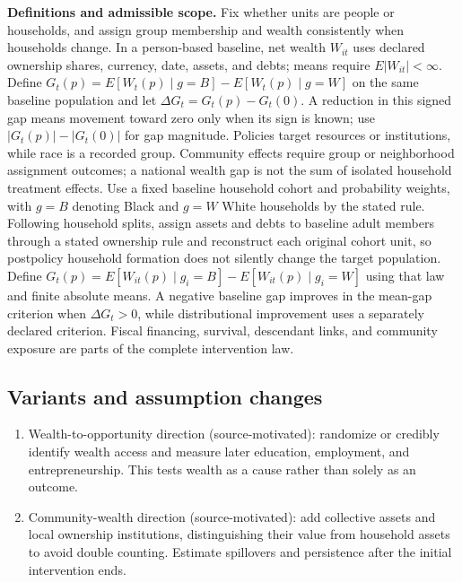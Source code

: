 \documentclass[11pt,a4paper]{article}
\begin{document}
\textbf{Definitions and admissible scope.} Fix whether units are people or households, and assign group membership and wealth consistently when households change. In a person-based baseline, net wealth \(W_{it}\) uses declared ownership shares, currency, date, assets, and debts; means require \(E|W_{it}|<\infty\). Define \(G_t(p)=E[W_t(p)\mid g=B]-E[W_t(p)\mid g=W]\) on the same baseline population and let \(\Delta G_t=G_t(p)-G_t(0)\). A reduction in this signed gap means movement toward zero only when its sign is known; use \(|G_t(p)|-|G_t(0)|\) for gap magnitude. Policies target resources or institutions, while race is a recorded group. Community effects require group or neighborhood assignment outcomes; a national wealth gap is not the sum of isolated household treatment effects. Use a fixed baseline household cohort and probability weights, with \(g=B\) denoting Black and \(g=W\) White households by the stated rule. Following household splits, assign assets and debts to baseline adult members through a stated ownership rule and reconstruct each original cohort unit, so postpolicy household formation does not silently change the target population. Define \(G_t(p)=E[W_{it}(p)\mid g_i=B]-E[W_{it}(p)\mid g_i=W]\) using that law and finite absolute means. A negative baseline gap improves in the mean-gap criterion when \(\Delta G_t>0\), while distributional improvement uses a separately declared criterion. Fiscal financing, survival, descendant links, and community exposure are parts of the complete intervention law.
\subsection*{Variants and assumption changes}
\begin{enumerate}
\item Wealth-to-opportunity direction (source-motivated): randomize or credibly identify wealth access and measure later education, employment, and entrepreneurship. This tests wealth as a cause rather than solely as an outcome.
\item Community-wealth direction (source-motivated): add collective assets and local ownership institutions, distinguishing their value from household assets to avoid double counting. Estimate spillovers and persistence after the initial intervention ends.
\end{enumerate}
\end{document}
